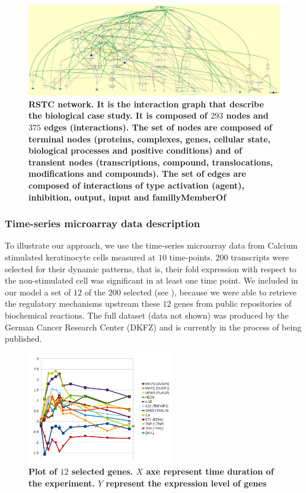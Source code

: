 \begin{figure}[!t]
 \centering
 \includegraphics[width=6.5in]{images/net.jpg}
\caption{{\bf RSTC network. It is the interaction graph that describe the biological case study. It is composed of $293$ nodes and $375$ edges (interactions).
The set of nodes are composed of terminal nodes (proteins, complexes, genes, cellular state, biological processes and positive conditions) and of transient
nodes (transcriptions, compound, translocations, modifications and compounds). The set of edges are composed of interactions of type activation (agent), inhibition, output, 
input and famillyMemberOf}} 
 \label{fig:network}
\end{figure}

\subsubsection{Time-series microarray data description}
\label{SECTSD}
To illustrate our approach, we use the time-series microarray data from Calcium stimulated keratinocyte cells 
 measured at $10$ time-points. $200$ transcripts were selected for their dynamic patterns,
that is, their fold expression with respect to the non-stimulated cell was significant in at least one time point. 
We included in our model a set of $12$ of the $200$ selected (see ), because we were able to retrieve the regulatory mechanisms upstream
these $12$ genes from public repositories of biochemical reactions.
The full dataset (data not shown) was produced by the German Cancer Research Center (DKFZ) and is currently in the process
of being published.  

\begin{figure}[!t]
\centering
\includegraphics[width=2.5in]{images/12genes.png}
\caption{\bf Plot of $12$ selected genes. $X$ axe represent time duration of the experiment. $Y$ represent the expression level of genes}
\label{fig:tsd}
\end{figure}


